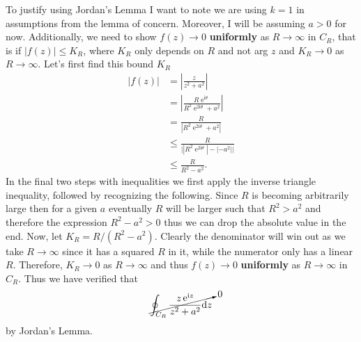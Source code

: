 \documentclass[10pt]{amsart}
\newcommand{\D}{\mathrm{d}}
\newcommand{\I}{\mathrm{i}}
\DeclareMathOperator{\E}{e}
\theoremstyle{nonumberplain}
\begin{document}
\begin{enumerate}[label={\bf {\arabic*}:}]
\noindent
To justify using Jordan's Lemma I want to note we are using $k = 1$ in assumptions from the lemma of concern.
Moreover, I will be assuming $a > 0$ for now.
Additionally, we need to show $f(z) \rightarrow 0$ {\bf uniformly} as $R\rightarrow \infty $ in $C_R$, that is if $|f(z)| \leq K_R$, where $K_R$ only depends on $R$ and not arg $z$ and $K_R \rightarrow 0 $ as $ R \rightarrow \infty$.
Let's first find this bound $K_R$
\begin{align*}
|f(z)| &= \left| \frac z {z^2 + a^2} \right| \\
	&= \left| \frac {R \E^{\I \theta}} {R^2 \E^{2 \I \theta} + a^2} \right| \\
	&= \frac {R} { \left|  R^2 \E^{2 \I \theta} + a^2 \right| } \\
	&\leq \frac {R} { \big| \left|R^2 \E^{2 \I \theta} \right| - \left| - a^2 \right| \big| } \\
	&\leq \frac {R} { R^2 - a^2 }.
\end{align*}
In the final two steps with inequalities we first apply the inverse triangle inequality, followed by recognizing the following.
Since $R$ is becoming arbitrarily large then for a given $a$ eventually $R$ will be larger such that $R^2 > a^2$ and therefore the expression $R^2 - a^2 > 0$ thus we can drop the absolute value in the end.
Now, let $K_R = R/(R^2 - a^2)$.
Clearly the denominator will win out as we take $R \rightarrow \infty$ since it has a squared $R$ in it, while the numerator only has a linear $R$.
Therefore, $K_R \rightarrow 0 $ as $ R \rightarrow \infty$ and thus $f(z) \rightarrow 0$ {\bf uniformly} as $R\rightarrow \infty $ in $C_R$.
Thus we have verified that
$$
\cancelto{0}{\oint_{C_R} \frac {z \E^{\I z}}{z^2 + a^2 } \D z}
$$
by Jordan's Lemma. \\


\end{enumerate}
\end{document}
